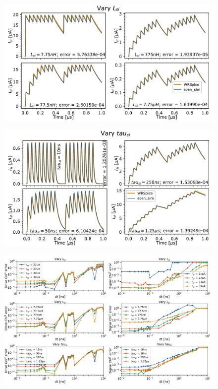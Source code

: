 \documentclass[twocolumn]{article}
\begin{document}
\begin{figure}[htb]
\includegraphics[width=17.2cm]{figures/_04__syn__cmpr__vary_Lsi.pdf}
\end{figure}

\begin{figure}[htb]
\includegraphics[width=17.2cm]{figures/_04__syn__cmpr__vary_tausi.pdf}
\end{figure}

\begin{figure}[htb]
\includegraphics[width=17.2cm]{figures/_05__syn__error_vs_dt.pdf}
\end{figure}
\end{document}
